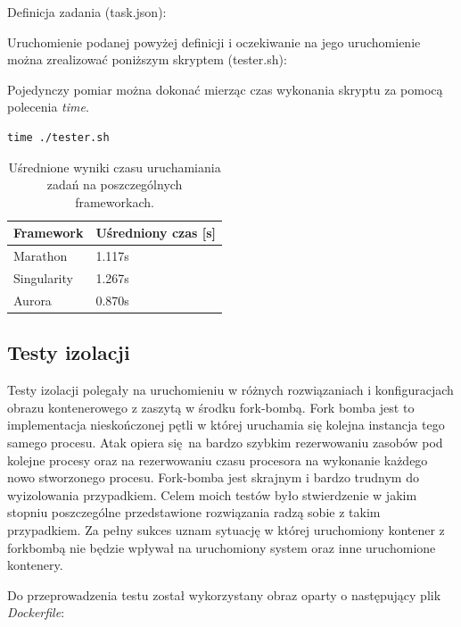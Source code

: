 \documentclass[10pt,a4paper,titlepage,twoside]{report}
\begin{document}
Definicja zadania (task.json):


Uruchomienie podanej powyżej definicji i oczekiwanie na jego uruchomienie można zrealizować poniższym skryptem (tester.sh):


Pojedynczy pomiar można dokonać mierząc czas wykonania skryptu za pomocą polecenia \textit{time}.
\begin{lstlisting}
time ./tester.sh
\end{lstlisting}

\begin{table}[!h]
\caption{Uśrednione wyniki czasu uruchamiania zadań na poszczególnych frameworkach.}
\label{framework_results}
\centering
\begin{tabular}{|p{4cm}|p{4cm}|}
  \hline
  \textbf{Framework} & \textbf{Uśredniony czas [s]} \\
  \hline
  Marathon & 1.117s \\
  \hline
  Singularity & 1.267s \\
  \hline
  Aurora & 0.870s \\
  \hline
\end{tabular}
\end{table}

\subsection{Testy izolacji}
Testy izolacji polegały na uruchomieniu w różnych rozwiązaniach i konfiguracjach obrazu kontenerowego z zaszytą w środku fork-bombą. Fork bomba jest to implementacja nieskończonej pętli w której uruchamia się kolejna instancja tego samego procesu. Atak opiera się na bardzo szybkim rezerwowaniu zasobów pod kolejne procesy oraz na rezerwowaniu czasu procesora na wykonanie każdego nowo stworzonego procesu. Fork-bomba jest skrajnym i bardzo trudnym do wyizolowania przypadkiem. Celem moich testów było stwierdzenie w jakim stopniu poszczególne przedstawione rozwiązania radzą sobie z takim przypadkiem. Za pełny sukces uznam sytuację w której uruchomiony kontener z forkbombą nie będzie wpływał na uruchomiony system oraz inne uruchomione kontenery.

Do przeprowadzenia testu został wykorzystany obraz oparty o następujący plik \textit{Dockerfile}:

\end{document}
